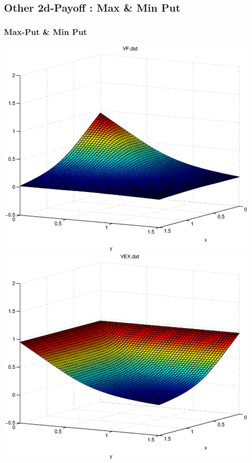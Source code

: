 \documentclass[]{beamer}
\begin{document}
\subsection{Other 2d-Payoff : Max \& Min Put}
\begin{frame}
\frametitle{Max-Put \& Min Put}
\includegraphics[scale=0.3]{put_max_2d.eps}
\includegraphics[scale=0.3]{put_min_2d.eps}
\end{frame}
\end{document}
